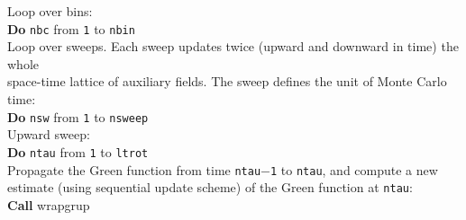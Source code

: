 \begin{mdframed}[frametitle={Basic structure of the auxiliary-field QMC implementation (\path{Prog/main.F90}):}]
{Loop over bins: \\
\textbf{Do} \texttt{nbc} from  \texttt{1} to \texttt{nbin} \\
\hspace*{1em} Loop over sweeps. Each sweep updates twice (upward and downward in time) the whole\\
\hspace*{1em} space-time lattice of auxiliary fields. The sweep defines the unit of Monte Carlo time:\\
\hspace*{1em} \textbf{Do} \texttt{nsw} from  \texttt{1} to \texttt{nsweep}  \\
\hspace*{2em} Upward sweep:\\
\hspace*{2em} \textbf{Do} \texttt{ntau} from \texttt{1} to \texttt{ltrot}\\      
\hspace*{3em} Propagate the Green function from time \texttt{ntau$-$1} to \texttt{ntau}, and compute a new\\
\hspace*{3em} estimate (using sequential update scheme) of the Green function at \texttt{ntau}: \\
\hspace*{3em} \textbf{Call} wrapgrup\\
         
}
\end{mdframed}
